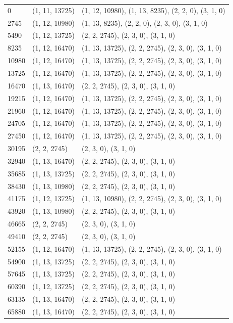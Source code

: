 \begin{center}
\begin{longtable}{|l|l|l|}
0 & (1, 11, 13725) & (1, 12, 10980), (1, 13, 8235), (2, 2, 0), (3, 1, 0) \\
2745 & (1, 12, 10980) & (1, 13, 8235), (2, 2, 0), (2, 3, 0), (3, 1, 0) \\
5490 & (1, 12, 13725) & (2, 2, 2745), (2, 3, 0), (3, 1, 0) \\
8235 & (1, 12, 16470) & (1, 13, 13725), (2, 2, 2745), (2, 3, 0), (3, 1, 0) \\
10980 & (1, 12, 16470) & (1, 13, 13725), (2, 2, 2745), (2, 3, 0), (3, 1, 0) \\
13725 & (1, 12, 16470) & (1, 13, 13725), (2, 2, 2745), (2, 3, 0), (3, 1, 0) \\
16470 & (1, 13, 16470) & (2, 2, 2745), (2, 3, 0), (3, 1, 0) \\
19215 & (1, 12, 16470) & (1, 13, 13725), (2, 2, 2745), (2, 3, 0), (3, 1, 0) \\
21960 & (1, 12, 16470) & (1, 13, 13725), (2, 2, 2745), (2, 3, 0), (3, 1, 0) \\
24705 & (1, 12, 16470) & (1, 13, 13725), (2, 2, 2745), (2, 3, 0), (3, 1, 0) \\
27450 & (1, 12, 16470) & (1, 13, 13725), (2, 2, 2745), (2, 3, 0), (3, 1, 0) \\
30195 & (2, 2, 2745) & (2, 3, 0), (3, 1, 0) \\
32940 & (1, 13, 16470) & (2, 2, 2745), (2, 3, 0), (3, 1, 0) \\
35685 & (1, 13, 13725) & (2, 2, 2745), (2, 3, 0), (3, 1, 0) \\
38430 & (1, 13, 10980) & (2, 2, 2745), (2, 3, 0), (3, 1, 0) \\
41175 & (1, 12, 13725) & (1, 13, 10980), (2, 2, 2745), (2, 3, 0), (3, 1, 0) \\
43920 & (1, 13, 10980) & (2, 2, 2745), (2, 3, 0), (3, 1, 0) \\
46665 & (2, 2, 2745) & (2, 3, 0), (3, 1, 0) \\
49410 & (2, 2, 2745) & (2, 3, 0), (3, 1, 0) \\
52155 & (1, 12, 16470) & (1, 13, 13725), (2, 2, 2745), (2, 3, 0), (3, 1, 0) \\
54900 & (1, 13, 13725) & (2, 2, 2745), (2, 3, 0), (3, 1, 0) \\
57645 & (1, 13, 13725) & (2, 2, 2745), (2, 3, 0), (3, 1, 0) \\
60390 & (1, 12, 13725) & (2, 2, 2745), (2, 3, 0), (3, 1, 0) \\
63135 & (1, 13, 16470) & (2, 2, 2745), (2, 3, 0), (3, 1, 0) \\
65880 & (1, 13, 16470) & (2, 2, 2745), (2, 3, 0), (3, 1, 0) \\

\end{longtable}
\end{center}
